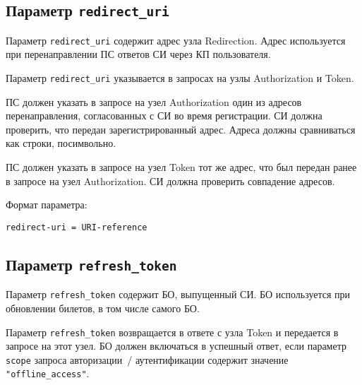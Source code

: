 \subsection{Параметр \lstinline{redirect_uri}}\label{PARAMS.RedirectUri}

Параметр \lstinline{redirect_uri} содержит адрес узла Redirection.
Адрес используется при перенаправлении ПС ответов СИ через КП пользователя.

Параметр \lstinline{redirect_uri} указывается в запросах на узлы Authorization 
и Token.

ПС должен указать в запросе на узел Authorization один из адресов перенаправления, 
согласованных с СИ во время регистрации. СИ должна проверить, что передан 
зарегистрированный адрес. Адреса должны сравниваться как строки, посимвольно.

ПС должен указать в запросе на узел Token тот же адрес, что был передан ранее 
в запросе на узел Authorization. СИ должна проверить совпадение адресов.

Формат параметра:
\begin{lstlisting}
redirect-uri = URI-reference
\end{lstlisting}



\subsection{Параметр \lstinline{refresh_token}}\label{PARAMS.RefreshToken} 

Параметр \lstinline{refresh_token} содержит БО, выпущенный СИ.
БО используется при обновлении билетов, в том числе самого БО.

Параметр \lstinline{refresh_token} возвращается в ответе с узла Token и 
передается в запросе на этот узел.
%
БО должен включаться в успешный ответ, если параметр \lstinline{scope} 
запроса авторизации~/ аутентификации содержит значение 
\lstinline{"offline_access"}. 

